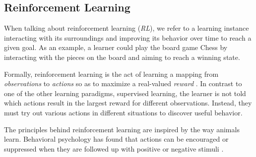 \subsection{Reinforcement Learning}
When talking about reinforcement learning (\textit{RL}), we refer to a learning instance interacting with its surroundings and improving its behavior over time to reach a given goal. As an example, a learner could play the board game Chess by interacting with the pieces on the board and aiming to reach a winning state.

Formally, reinforcement learning is the act of learning a mapping from \textit{observations} to \textit{actions} so as to maximize a real-valued \textit{reward} \cite{bible}. In contrast to one of the other learning paradigms, supervised learning, the learner is not told which actions result in the largest reward for different observations. Instead, they must try out various actions in different situations to discover useful behavior.

The principles behind reinforcement learning are inspired by the way animals learn. Behavioral psychology has found that actions can be encouraged or suppressed when they are followed up with positive or negative stimuli \cite{thorndike}.






